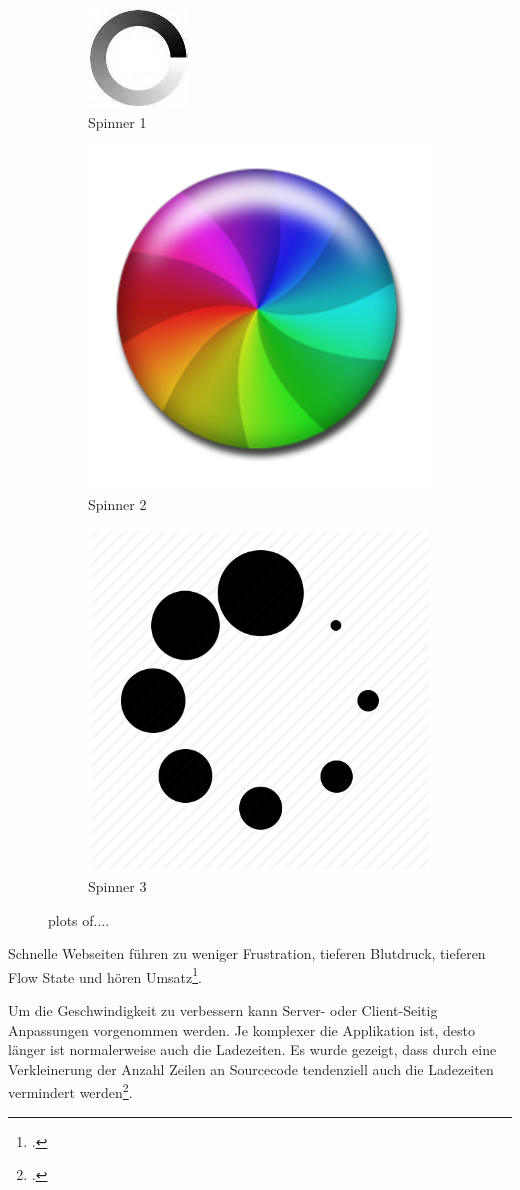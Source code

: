 \begin{figure}[H]
	\begin{subfigure}{.3\textwidth}
	  \centering
	  \includegraphics[width=.2\linewidth]{images/spinner1.jpeg}
	  \caption{Spinner 1}
	  \label{fig:requirementsengineerin:nichtfunktionale:geschwindigkeit:spinner:1}
	\end{subfigure}%
	\begin{subfigure}{.3\textwidth}
	 \centering
	 \includegraphics[width=.2\linewidth]{images/spinner2.png}
	 \caption{Spinner 2}
  	 \label{fig:requirementsengineerin:nichtfunktionale:geschwindigkeit:spinner:2}
	\end{subfigure}
	\begin{subfigure}{.3\textwidth}
	\centering
	\includegraphics[width=.2\linewidth]{images/spinner3.png}
	\caption{Spinner 3}
 	 \label{fig:requirementsengineerin:nichtfunktionale:geschwindigkeit:spinner:2}
	\end{subfigure}
	\caption{plots of....}
	  \label{fig:requirementsengineerin:nichtfunktionale:geschwindigkeit:spinner}
\end{figure}

Schnelle Webseiten führen zu weniger Frustration, tieferen Blutdruck, tieferen Flow State und hören Umsatz\footcite{The_Psychology_of_Web_Performance_-_how_slow_response_times_affect_user_psychology_2015-06-01}.

Um die Geschwindigkeit zu verbessern kann Server- oder Client-Seitig Anpassungen vorgenommen werden. Je komplexer die Applikation ist, desto länger ist normalerweise auch die Ladezeiten. Es wurde gezeigt, dass durch eine Verkleinerung der Anzahl Zeilen an Sourcecode tendenziell auch die Ladezeiten vermindert werden\footcite{Web_Page_Performance_Thesis_-_web_page_response_time_measurement_modeling_and_monitoring_2015-06-01}.


